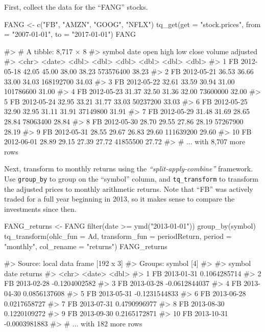 First, collect the data for the ``FANG'' stocks.

\begin{Schunk}
\begin{Sinput}
FANG <- c("FB", "AMZN", "GOOG", "NFLX") %
    tq_get(get = "stock.prices",
           from = "2007-01-01",
           to   = "2017-01-01")
FANG
\end{Sinput}
\end{Schunk}

\begin{Schunk}
\begin{Soutput}
#> # A tibble: 8,717 × 8
#>    symbol       date  open  high   low close    volume adjusted
#>     <chr>     <date> <dbl> <dbl> <dbl> <dbl>     <dbl>    <dbl>
#> 1      FB 2012-05-18 42.05 45.00 38.00 38.23 573576400    38.23
#> 2      FB 2012-05-21 36.53 36.66 33.00 34.03 168192700    34.03
#> 3      FB 2012-05-22 32.61 33.59 30.94 31.00 101786600    31.00
#> 4      FB 2012-05-23 31.37 32.50 31.36 32.00  73600000    32.00
#> 5      FB 2012-05-24 32.95 33.21 31.77 33.03  50237200    33.03
#> 6      FB 2012-05-25 32.90 32.95 31.11 31.91  37149800    31.91
#> 7      FB 2012-05-29 31.48 31.69 28.65 28.84  78063400    28.84
#> 8      FB 2012-05-30 28.70 29.55 27.86 28.19  57267900    28.19
#> 9      FB 2012-05-31 28.55 29.67 26.83 29.60 111639200    29.60
#> 10     FB 2012-06-01 28.89 29.15 27.39 27.72  41855500    27.72
#> # ... with 8,707 more rows
\end{Soutput}
\end{Schunk}

Next, transform to monthly returns using the
\emph{``split-apply-combine''} framework. Use \texttt{group\_by} to
group on the ``symbol'' column, and \texttt{tq\_transform} to transform
the adjusted prices to monthly arithmetic returns. Note that ``FB'' was
actively traded for a full year beginning in 2013, so it makes sense to
compare the investments since then.

\begin{Schunk}
\begin{Sinput}
FANG_returns <- FANG %
    filter(date >= ymd("2013-01-01")) %
    group_by(symbol) %
    tq_transform(ohlc_fun = Ad,
                 transform_fun = periodReturn,
                 period = "monthly",
                 col_rename = "returns")
FANG_returns
\end{Sinput}
\begin{Soutput}
#> Source: local data frame [192 x 3]
#> Groups: symbol [4]
#> 
#>    symbol       date       returns
#>     <chr>     <date>         <dbl>
#> 1      FB 2013-01-31  0.1064285714
#> 2      FB 2013-02-28 -0.1204002582
#> 3      FB 2013-03-28 -0.0612844037
#> 4      FB 2013-04-30  0.0856137608
#> 5      FB 2013-05-31 -0.1231544833
#> 6      FB 2013-06-28  0.0217658727
#> 7      FB 2013-07-31  0.4790996977
#> 8      FB 2013-08-30  0.1220109272
#> 9      FB 2013-09-30  0.2165172871
#> 10     FB 2013-10-31 -0.0003981883
#> # ... with 182 more rows
\end{Soutput}
\end{Schunk}

